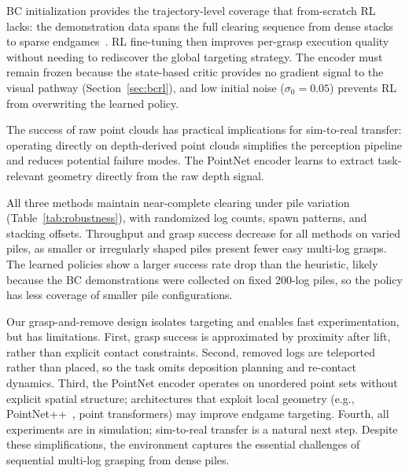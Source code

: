 \documentclass[conference]{IEEEtran}
\begin{document}
BC initialization provides the trajectory-level coverage that from-scratch RL lacks: the demonstration data spans the full clearing sequence from dense stacks to sparse endgames~\cite{rajeswaran2018learning}.
RL fine-tuning then improves per-grasp execution quality without needing to rediscover the global targeting strategy.
The encoder must remain frozen because the state-based critic provides no gradient signal to the visual pathway (Section~\ref{sec:bcrl}), and low initial noise ($\sigma_0 = 0.05$) prevents RL from overwriting the learned policy.

The success of raw point clouds has practical implications for sim-to-real transfer: operating directly on depth-derived point clouds simplifies the perception pipeline and reduces potential failure modes.
The PointNet encoder learns to extract task-relevant geometry directly from the raw depth signal.

All three methods maintain near-complete clearing under pile variation (Table~\ref{tab:robustness}), with randomized log counts, spawn patterns, and stacking offsets.
Throughput and grasp success decrease for all methods on varied piles, as smaller or irregularly shaped piles present fewer easy multi-log grasps.
The learned policies show a larger success rate drop than the heuristic, likely because the BC demonstrations were collected on fixed 200-log piles, so the policy has less coverage of smaller pile configurations.

Our grasp-and-remove design isolates targeting and enables fast experimentation, but has limitations.
First, grasp success is approximated by proximity after lift, rather than explicit contact constraints.
Second, removed logs are teleported rather than placed, so the task omits deposition planning and re-contact dynamics.
Third, the PointNet encoder operates on unordered point sets without explicit spatial structure; architectures that exploit local geometry (e.g., PointNet++~\cite{qi2017pointnetplusplus}, point transformers) may improve endgame targeting.
Fourth, all experiments are in simulation; sim-to-real transfer is a natural next step.
Despite these simplifications, the environment captures the essential challenges of sequential multi-log grasping from dense piles.
\end{document}
